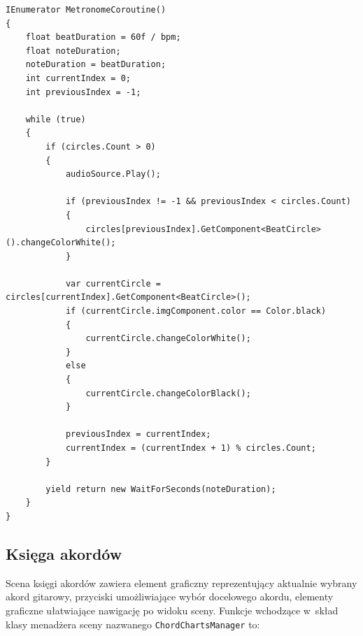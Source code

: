 \begin{lstlisting}[style=sharpcstyle,caption=Wątek \texttt{MetronomeCoroutine}, label=lst:2]
IEnumerator MetronomeCoroutine()
{
    float beatDuration = 60f / bpm;
    float noteDuration;
    noteDuration = beatDuration;
    int currentIndex = 0;
    int previousIndex = -1;

    while (true)
    {
        if (circles.Count > 0)
        {
            audioSource.Play();
            
            if (previousIndex != -1 && previousIndex < circles.Count)
            {
                circles[previousIndex].GetComponent<BeatCircle>().changeColorWhite();
            }
            
            var currentCircle = circles[currentIndex].GetComponent<BeatCircle>();
            if (currentCircle.imgComponent.color == Color.black)
            {
                currentCircle.changeColorWhite();
            }
            else
            {
                currentCircle.changeColorBlack();
            }

            previousIndex = currentIndex;
            currentIndex = (currentIndex + 1) % circles.Count;
        }
        
        yield return new WaitForSeconds(noteDuration);
    }
}
\end{lstlisting}

\subsection{Księga akordów}
Scena księgi akordów zawiera element graficzny reprezentujący aktualnie wybrany akord gitarowy, przyciski umożliwiające wybór docelowego akordu, elementy graficzne ułatwiające nawigację po widoku sceny. Funkcje wchodzące w~skład klasy menadżera sceny nazwanego \texttt{ChordChartsManager} to:

